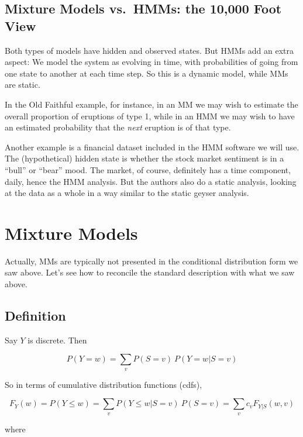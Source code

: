 \documentclass[11pt]{article}
\begin{document}
\subsection{Mixture Models vs.\ HMMs: the 10,000 Foot View}

Both types of models have hidden and observed states.  But HMMs add an
extra aspect:  We model the system as evolving in time, with
probabilities of going from one state to another at each time step.  So
this is a dynamic model, while MMs are static. 

In the Old Faithful example, for instance, in an MM we may wish to
estimate the overall proportion of eruptions of type 1, while in an
HMM we may wish to have an estimated probability that the \textit{next}
eruption is of that type.

Another example is a financial dataset included in the HMM software we will
use.  The (hypothetical) hidden state is whether the stock market
sentiment is in a ``bull'' or ``bear'' mood.  The market, of course,
definitely has a time component, daily, hence the HMM analysis.  But the
authors also do a static analysis, looking at the data as a whole in a
way similar to the static geyser analysis.

\section{Mixture Models}

Actually, MMs are typically not presented in the conditional distribution
form we saw above.  Let's see how to reconcile the standard description
with what we saw above.

\subsection{Definition}
\label{mixdef}

Say $Y$ is discrete.  Then

\begin{equation}
P(Y = w) = \sum_{v} P(S = v) ~ P(Y = w | S = v)
\end{equation}

So in terms of cumulative distribution functions (cdfs),

\begin{equation}
\label{mixedFs}
F_Y(w) = P(Y \leq w) = 
\sum_{v} P(Y \leq w | S = v) ~ P(S = v) =
\sum_{v} c_v F_{Y|S}(w,v)
\end{equation}

where 
\end{document}
